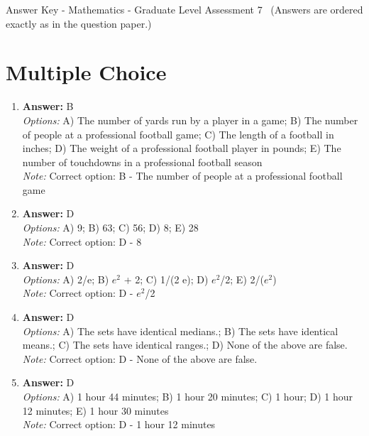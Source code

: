 \documentclass[12pt]{article}
\begin{document}
\begin{center}
Answer Key - Mathematics - Graduate Level Assessment 7 \
\small (Answers are ordered exactly as in the question paper.)
\end{center}

\section*{Multiple Choice}
\begin{enumerate}[label=\arabic*.]
\item \textbf{Answer:} B
\\ \textit{Options:} A) The number of yards run by a player in a game; B) The number of people at a professional football game; C) The length of a football in inches; D) The weight of a professional football player in pounds; E) The number of touchdowns in a professional football season
\\ \textit{Note:} Correct option: B - The number of people at a professional football game
\item \textbf{Answer:} D
\\ \textit{Options:} A) 9; B) 63; C) 56; D) 8; E) 28
\\ \textit{Note:} Correct option: D - 8
\item \textbf{Answer:} D
\\ \textit{Options:} A) 2/e; B) $e^2$ + 2; C) 1/(2 e); D) $e^2$/2; E) 2/($e^2$)
\\ \textit{Note:} Correct option: D - $e^2$/2
\item \textbf{Answer:} D
\\ \textit{Options:} A) The sets have identical medians.; B) The sets have identical means.; C) The sets have identical ranges.; D) None of the above are false.
\\ \textit{Note:} Correct option: D - None of the above are false.
\item \textbf{Answer:} D
\\ \textit{Options:} A) 1 hour 44 minutes; B) 1 hour 20 minutes; C) 1 hour; D) 1 hour 12 minutes; E) 1 hour 30 minutes
\\ \textit{Note:} Correct option: D - 1 hour 12 minutes
\end{enumerate}
\end{document}

